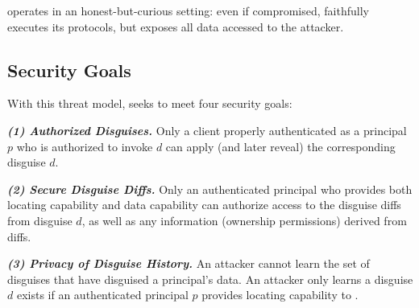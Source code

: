 %
\sys operates in an honest-but-curious setting: even if compromised, \sys faithfully executes
its protocols, but exposes all data accessed to the attacker.
%

\subsection{Security Goals}
%
With this threat model, \sys seeks to meet four security goals:
%

%
\vspace{6pt}\noindent\textbf{\emph{(1) Authorized Disguises.}}
%
Only a client properly authenticated as a principal $p$ who is authorized to invoke $d$ can apply
(and later reveal) the corresponding disguise $d$.
%

%
%

\vspace{6pt}\noindent\textbf{\emph{(2) Secure Disguise Diffs.}}
%
Only an authenticated principal who provides both locating capability  and data capability
 can authorize access to the disguise diffs from disguise $d$, as well as any information
(\eg ownership permissions) derived from diffs.
%

\vspace{6pt}\noindent\textbf{\emph{(3) Privacy of Disguise History.}}
%
An attacker cannot learn the set of disguises that have disguised a principal's data.
%
An attacker only learns a disguise $d$ exists if an authenticated principal $p$ provides
locating capability  to \sys.

